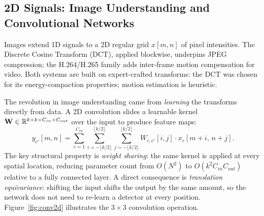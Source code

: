 \subsection{2D Signals: Image Understanding and Convolutional Networks}

Images extend 1D signals to a 2D regular grid $x[m, n]$ of pixel intensities.
The Discrete Cosine Transform (DCT), applied blockwise, underpins JPEG
compression; the H.264/H.265 family adds inter-frame motion compensation for
video.
Both systems are built on expert-crafted transforms: the DCT was chosen
for its energy-compaction properties; motion estimation is heuristic.

The revolution in image understanding came from \emph{learning} the transforms
directly from data.
A 2D convolution slides a learnable kernel
$\mathbf{W} \in \mathbb{R}^{k \times k \times C_{in} \times C_{out}}$
over the input to produce feature maps:
\begin{equation}
  y_{c'}[m, n] = \sum_{c=1}^{C_{in}} \sum_{i=-\lfloor k/2\rfloor}^{\lfloor k/2\rfloor}
    \sum_{j=-\lfloor k/2\rfloor}^{\lfloor k/2\rfloor}
    W_{c,c'}[i, j] \cdot x_c[m+i,\, n+j].
\end{equation}
The key structural property is \emph{weight sharing}: the same kernel is
applied at every spatial location, reducing parameter count from $O(N^2)$
to $O(k^2 C_{in} C_{out})$ relative to a fully connected layer.
A direct consequence is \emph{translation equivariance}: shifting the input
shifts the output by the same amount, so the network does not need to
re-learn a detector at every position.
Figure~\ref{fig:conv2d} illustrates the $3\times 3$ convolution operation.


